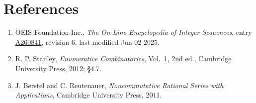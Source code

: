 \documentclass[11pt]{article}
\theoremstyle{definition}
\begin{document}
\section{References}

\begin{enumerate}

\item OEIS Foundation Inc., \emph{The On-Line Encyclopedia of Integer Sequences}, entry \href{https://oeis.org/A260841}{A260841}, revision 6, last modified Jun 02 2025.

\item R. P. Stanley, \emph{Enumerative Combinatorics}, Vol.~1, 2nd ed., Cambridge University Press, 2012; \S4.7.

\item J. Berstel and C. Reutenauer, \emph{Noncommutative Rational Series with Applications}, Cambridge University Press, 2011.

\end{enumerate}
\end{document}
